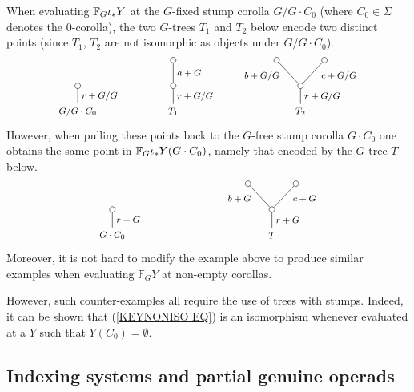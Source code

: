 \documentclass[a4paper,10pt]{article}%
\begin{document}
\begin{remark}
	When evaluating $\mathbb{F}_G \iota_{\**} Y$ at the $G$-fixed stump corolla $G/G \cdot C_0$ 
	(where $C_0 \in \Sigma$ denotes the $0$-corolla),
	 the two $G$-trees $T_1$ and $T_2$ below encode two distinct points (since $T_1$, $T_2$ are not isomorphic as objects under $G/G\cdot C_0$).
\[
\begin{tikzpicture}[grow=up,auto,level distance=2.3em,every node/.style = {font=\footnotesize},dummy/.style={circle,draw,inner sep=0pt,minimum size=1.75mm}]
	\node at (0,0) {$G/G \cdot C_0$}
		child{
			node [dummy] {}
		edge from parent node [swap] {$r+G/G$}};
	\node at (3,0) {$T_1$}
		child{node [dummy] {}
			child{node [dummy] {}
			edge from parent node [swap] {$a+G$}}
		edge from parent node [swap] {$r+G/G$}};
	\node at (7,0) {$T_2$}
		child{node [dummy] {}
			child{node [dummy] {}
			edge from parent node [swap,near end] {$c+G/G$}}
			child{node [dummy] {}
			edge from parent node [near end] {$b+G/G$}}
		edge from parent node [swap] {$r+G/G$}};
\end{tikzpicture}
\]
However, when pulling these points back to the $G$-free stump corolla $G \cdot C_0$ one obtains the same point in 
$\mathbb F_G \iota_{\**} Y(G \cdot C_0)$,
namely that encoded by the $G$-tree $T$ below.
\[
\begin{tikzpicture}[grow=up,auto,level distance=2.3em,every node/.style = {font=\footnotesize},dummy/.style={circle,draw,inner sep=0pt,minimum size=1.75mm}]
	\node at (0,0) {$G \cdot C_0$}
		child{
			node [dummy] {}
		edge from parent node [swap] {$r+G$}};
	\node at (5,0) {$T$}
		child{node [dummy] {}
			child{node [dummy] {}
			edge from parent node [swap,near end] {$c+G$}}
			child{node [dummy] {}
			edge from parent node [near end] {$b+G$}}
		edge from parent node [swap] {$r+G$}};
\end{tikzpicture}
\]
Moreover, it is not hard to modify the example above to produce similar examples when evaluating $\mathbb{F}_GY$ at non-empty corollas. 

However, such counter-examples all require the use of trees with stumps. Indeed, it can be shown that (\ref{KEYNONISO EQ})
is an isomorphism whenever evaluated at a $Y$ such that $Y(C_0)=\emptyset$.
\end{remark}


\renewcommand{\F}{\mathcal{F}}

\subsection{Indexing systems and partial genuine operads}
\label{INDEXING_SECTION}
\end{document}
